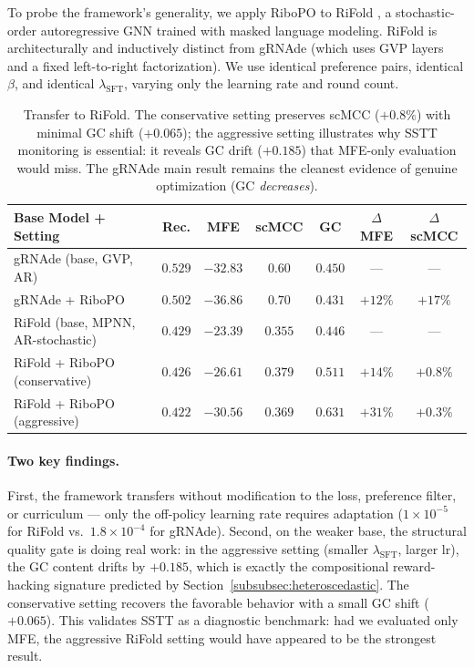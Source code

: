 {{To probe the framework's generality, we apply RiboPO to RiFold \citep{liu2025sentences}, a stochastic-order autoregressive GNN trained with masked language modeling. RiFold is architecturally and inductively distinct from gRNAde (which uses GVP layers and a fixed left-to-right factorization). We use identical preference pairs, identical $\beta$, and identical $\lambda_{\text{SFT}}$, varying only the learning rate and round count.

\begin{table}[h]
\centering
\caption{Transfer to RiFold. The conservative setting preserves scMCC ($+0.8\%$) with minimal GC shift ($+0.065$); the aggressive setting illustrates why SSTT monitoring is essential: it reveals GC drift ($+0.185$) that MFE-only evaluation would miss. The gRNAde main result remains the cleanest evidence of genuine optimization (GC \emph{decreases}).}
\label{tab:rifold_transfer}
\small
\begin{tabular}{lcccccc}
\toprule
\textbf{Base Model + Setting} & \textbf{Rec.} & \textbf{MFE} & \textbf{scMCC} & \textbf{GC} & $\Delta$\textbf{MFE} & $\Delta$\textbf{scMCC} \\
\midrule
gRNAde (base, GVP, AR) & $0.529$ & $-32.83$ & $0.60$ & $0.450$ & --- & --- \\
gRNAde + RiboPO & $0.502$ & $-36.86$ & $0.70$ & $0.431$ & $+12\%$ & $+17\%$ \\
\midrule
RiFold (base, MPNN, AR-stochastic) & $0.429$ & $-23.39$ & $0.355$ & $0.446$ & --- & --- \\
RiFold + RiboPO (conservative) & $0.426$ & $-26.61$ & $0.379$ & $0.511$ & $+14\%$ & $+0.8\%$ \\
RiFold + RiboPO (aggressive) & $0.422$ & $-30.56$ & $0.369$ & $0.631$ & $+31\%$ & $+0.3\%$ \\
\bottomrule
\end{tabular}
\end{table}

\paragraph{Two key findings.}
First, the framework transfers without modification to the loss, preference filter, or curriculum --- only the off-policy learning rate requires adaptation ($1\!\times\!10^{-5}$ for RiFold vs.\ $1.8\!\times\!10^{-4}$ for gRNAde). Second, on the weaker base, the structural quality gate is doing real work: in the aggressive setting (smaller $\lambda_{\text{SFT}}$, larger lr), the GC content drifts by $+0.185$, which is exactly the compositional reward-hacking signature predicted by Section~\ref{subsubsec:heteroscedastic}. The conservative setting recovers the favorable behavior with a small GC shift ($+0.065$). This validates SSTT as a diagnostic benchmark: had we evaluated only MFE, the aggressive RiFold setting would have appeared to be the strongest result.


}}
